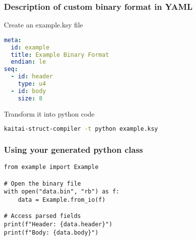 \begin{frame}[fragile]
\frametitle{Description of custom binary format in YAML}

Create an example.ksy file

\begin{lstlisting}[language=yaml]
meta:
  id: example
  title: Example Binary Format
  endian: le
seq:
  - id: header
    type: u4
  - id: body
    size: 8
\end{lstlisting}

Transform it into python code

\begin{lstlisting}[language=bash,frame=single]
kaitai-struct-compiler -t python example.ksy
\end{lstlisting}
\end{frame}



\begin{frame}[fragile]
\frametitle{Using your generated python class}

\begin{lstlisting}
from example import Example

# Open the binary file
with open("data.bin", "rb") as f:
    data = Example.from_io(f)

# Access parsed fields
print(f"Header: {data.header}")
print(f"Body: {data.body}")
\end{lstlisting}
\end{frame}
